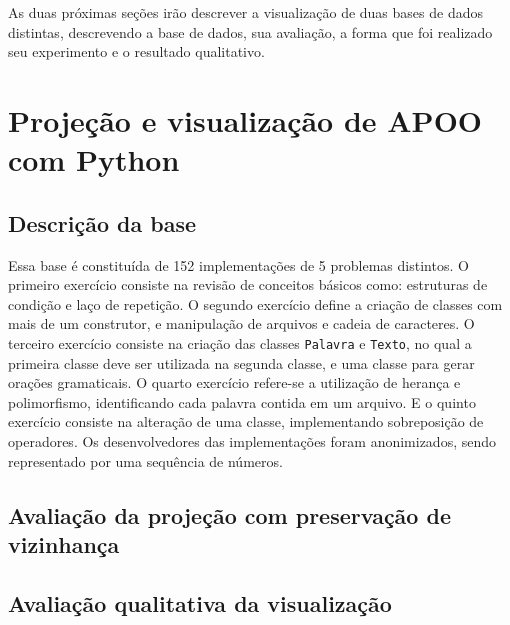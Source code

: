		
			
		As duas próximas seções irão descrever a visualização de duas bases de dados
		distintas, descrevendo a base de dados, sua avaliação, a forma que foi realizado
		seu experimento e o resultado qualitativo.
		
	\section{Projeção e visualização de APOO com Python}
	
	\subsection{Descrição da base}
	Essa base é constituída de 152 implementações de 5 problemas distintos. O primeiro exercício
	consiste na revisão de conceitos básicos como: estruturas de condição e laço de repetição. O
	segundo exercício define a criação de classes com mais de um construtor, e manipulação de
	arquivos e cadeia de caracteres. O terceiro exercício consiste na criação das classes
	\texttt{Palavra} e \texttt{Texto}, no qual a primeira classe deve ser utilizada na segunda
	classe, e uma classe para gerar orações gramaticais. O quarto exercício refere-se a
	utilização de herança e polimorfismo, identificando cada palavra contida em um arquivo. E
	o quinto exercício consiste na alteração de uma classe, implementando sobreposição de
	operadores. Os desenvolvedores das implementações foram anonimizados, sendo representado
	por uma sequência de números.
	
	\subsection{Avaliação da projeção com preservação de vizinhança}
	
	
	\subsection{Avaliação qualitativa da visualização}
	
